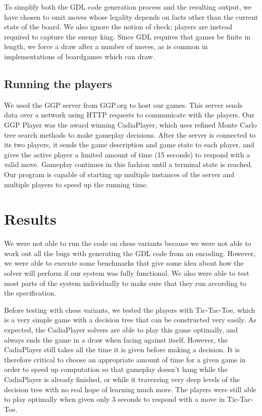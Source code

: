 \documentclass[11pt,letterpaper]{article}
\begin{document}
To simplify both the GDL code generation process and the resulting output, we
have chosen to omit moves whose legality depends on facts other than the current
state of the board. We also ignore the notion of check; players are instead
required to capture the enemy king. Since GDL requires that games be finite in
length, we force a draw after a number of moves, as is common in implementations
of boardgames which can draw.

\subsection{Running the players}
We used the GGP server from GGP.org to host our games. This server sends data over a network using HTTP requests to communicate with the players. Our GGP Player was the award winning CadiaPlayer, which uses refined Monte Carlo tree search methods to make gameplay decisions. After the server is connected to its two players, it sends the game description and game state to each player, and gives the active player a limited amount of time (15 seconds) to respond with a valid move. Gameplay continues in this fashion until a terminal state is reached. Our program is capable of starting up multiple instances of the server and multiple players to speed up the running time.

\section{Results}
We were not able to run the code on chess variants because we were not able to work out all the bugs with generating the GDL code from an encoding. However, we were able to execute some benchmarks that give some idea about how the solver will perform if our system was fully functional. We also were able to test most parts of the system individually to make sure that they run according to the specification.

Before testing with chess variants, we tested the players with Tic-Tac-Toe, which is a very simple game with a decision tree that can be constructed very easily. As expected, the CadiaPlayer solvers are able to play this game optimally, and always ends the game in a draw when facing against itself. However, the CadiaPlayer still takes all the time it is given before making a decision. It is therefore critical to choose an appropriate amount of time for a given game in order to speed up computation so that gameplay doesn't hang while the CadiaPlayer is already finished, or while it traversing very deep levels of the decision tree with no real hope of learning much more. The players were still able to play optimally when given only 3 seconds to respond with a move in Tic-Tac-Toe.
\end{document}
